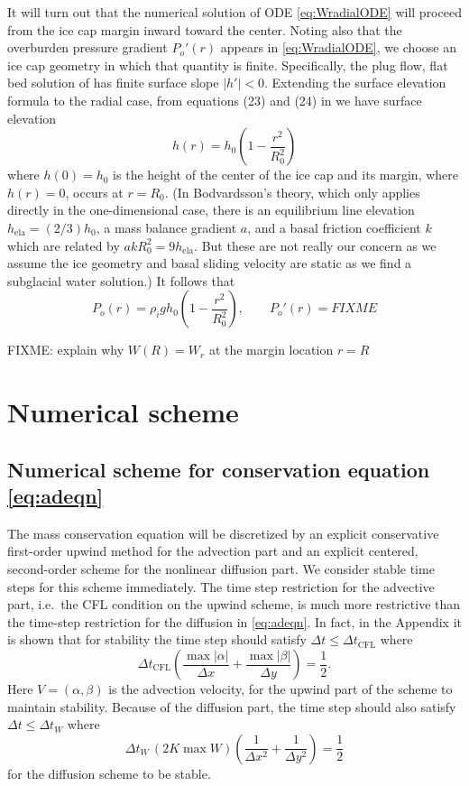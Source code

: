 \documentclass[11pt,final]{amsart}%
\begin{document}
It will turn out that the numerical solution of ODE \eqref{eq:WradialODE} will proceed from the ice cap margin inward toward the center.  Noting also that the overburden pressure gradient $P_o'(r)$ appears in \eqref{eq:WradialODE}, we choose an ice cap geometry in which that quantity is finite.  Specifically, the plug flow, flat bed solution of \cite{Bodvardsson} has finite surface slope $|h'|<0$.  Extending the surface elevation formula to the radial case, from equations (23) and (24) in \cite{Bodvardsson} we have surface elevation
    $$h(r) = h_0 \left(1 - \frac{r^2}{R_0^2} \right)$$
where $h(0)=h_0$ is the height of the center of the ice cap and its margin, where $h(r)=0$, occurs at $r=R_0$.  (In Bodvardsson's theory, which only applies directly in the one-dimensional case, there is an equilibrium line elevation $h_{\text{ela}}=(2/3) h_0$, a mass balance gradient $a$, and a basal friction coefficient $k$ which are related by $a k R_0^2 = 9 h_{\text{ela}}$.  But these are not really our concern as we assume the ice geometry and basal sliding velocity are static as we find a subglacial water solution.)  It follows that
    $$P_o(r) = \rho_i g h_0 \left(1 - \frac{r^2}{R_0^2} \right), \qquad P_o'(r) = FIXME$$

FIXME:  explain why $W(R)=W_r$ at the margin location $r=R$


\section{Numerical scheme}  \label{sec:num}

\subsection*{Numerical scheme for conservation equation \eqref{eq:adeqn}}  The mass conservation equation will be discretized by an explicit conservative first-order upwind method for the advection part and an explicit centered, second-order scheme for the nonlinear diffusion part.  We consider stable time steps for this scheme immediately.  The time step restriction for the advective part, i.e.~the CFL condition on the upwind scheme, is much more restrictive than the time-step restriction for the diffusion in \eqref{eq:adeqn}.  In fact, in the Appendix it is shown that for stability the time step should satisfy $\Delta t \le \Delta t_{\text{CFL}}$ where
\begin{equation}
\Delta t_{\text{CFL}} \left(\frac{\max |\alpha|}{\Delta x} + \frac{\max |\beta|}{\Delta y}\right) = \frac{1}{2}. \label{eq:dtCFL}
\end{equation}
Here $V=(\alpha,\beta)$ is the advection velocity, for the upwind part of the scheme to maintain stability.  Because of the diffusion part, the time step should also satisfy $\Delta t \le \Delta t_{W}$ where
\begin{equation}
\Delta t_W\, (2 K \max W) \left(\frac{1}{\Delta x^2} + \frac{1}{\Delta y^2}\right) = \frac{1}{2} \label{eq:dtDIFFW}
\end{equation}
for the diffusion scheme to be stable.
\end{document}
